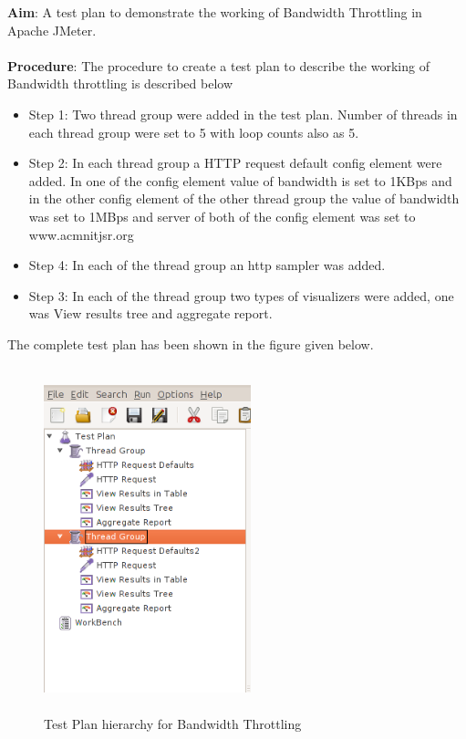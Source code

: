 \documentclass[12pt]{book}
\begin{document}
 \textbf{Aim}: A test plan to demonstrate the working of Bandwidth Throttling in Apache JMeter.\\
 \\
 \textbf{Procedure}: The procedure to create a test plan to describe the working of Bandwidth throttling is described below
 \\
 \begin{itemize}
  \item Step 1: Two thread group were added in the test plan. Number of threads in each thread group were set to 5 with loop counts also as 5.\\
  \item Step 2: In each thread group a HTTP request default config element were added. In one of the config element value of bandwidth is set to 1KBps
      and in the other config element of the other thread group the value of bandwidth was set to 1MBps and server of both of the config element was set
      to www.acmnitjsr.org \\
  \item Step 4: In each of the thread group an http sampler was added. \\
  \item Step 3: In each of the thread group two types of visualizers were added, one was View results tree and aggregate report.\\
 \end{itemize}
 The complete test plan has been shown in the figure given below.
  
  \begin{figure}[H]
   \centering
   \includegraphics[width=6cm, height=10cm]{images/bt_1}
   \caption{Test Plan hierarchy for Bandwidth Throttling\label{fig:fig51_JMeter}}
  \end{figure}  
   
\end{document}
